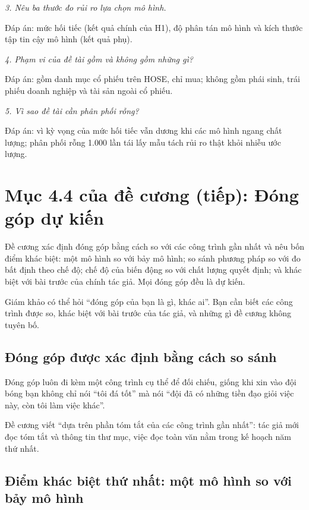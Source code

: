{\itshape 3. Nêu ba thước đo rủi ro lựa chọn mô hình.\par}

Đáp án: mức hối tiếc (kết quả chính của H1), độ phân tán mô hình và kích thước tập tin cậy mô hình (kết quả phụ).

{\itshape 4. Phạm vi của đề tài gồm và không gồm những gì?\par}

Đáp án: gồm danh mục cổ phiếu trên HOSE, chỉ mua; không gồm phái sinh, trái phiếu doanh nghiệp và tài sản ngoài cổ phiếu.

{\itshape 5. Vì sao đề tài cần phân phối rỗng?\par}

Đáp án: vì kỳ vọng của mức hối tiếc vẫn dương khi các mô hình ngang chất lượng; phân phối rỗng 1.000 lần tái lấy mẫu tách rủi ro thật khỏi nhiễu ước lượng.

\chapter{Mục 4.4 của đề cương (tiếp): Đóng góp dự kiến}

Đề cương xác định đóng góp bằng cách so với các công trình gần nhất và nêu bốn điểm khác biệt: một mô hình so với bảy mô hình; so sánh phương pháp so với đo bất định theo chế độ; chế độ của biến động so với chất lượng quyết định; và khác biệt với bài trước của chính tác giả. Mọi đóng góp đều là dự kiến.

Giám khảo có thể hỏi “đóng góp của bạn là gì, khác ai”. Bạn cần biết các công trình được so, khác biệt với bài trước của tác giả, và những gì đề cương không tuyên bố.

\section{Đóng góp được xác định bằng cách so sánh}

Đóng góp luôn đi kèm một công trình cụ thể để đối chiếu, giống khi xin vào đội bóng bạn không chỉ nói “tôi đá tốt” mà nói “đội đã có những tiền đạo giỏi việc này, còn tôi làm việc khác”.

Đề cương viết “dựa trên phần tóm tắt của các công trình gần nhất”: tác giả mới đọc tóm tắt và thông tin thư mục, việc đọc toàn văn nằm trong kế hoạch năm thứ nhất.

\section{Điểm khác biệt thứ nhất: một mô hình so với bảy mô hình}

